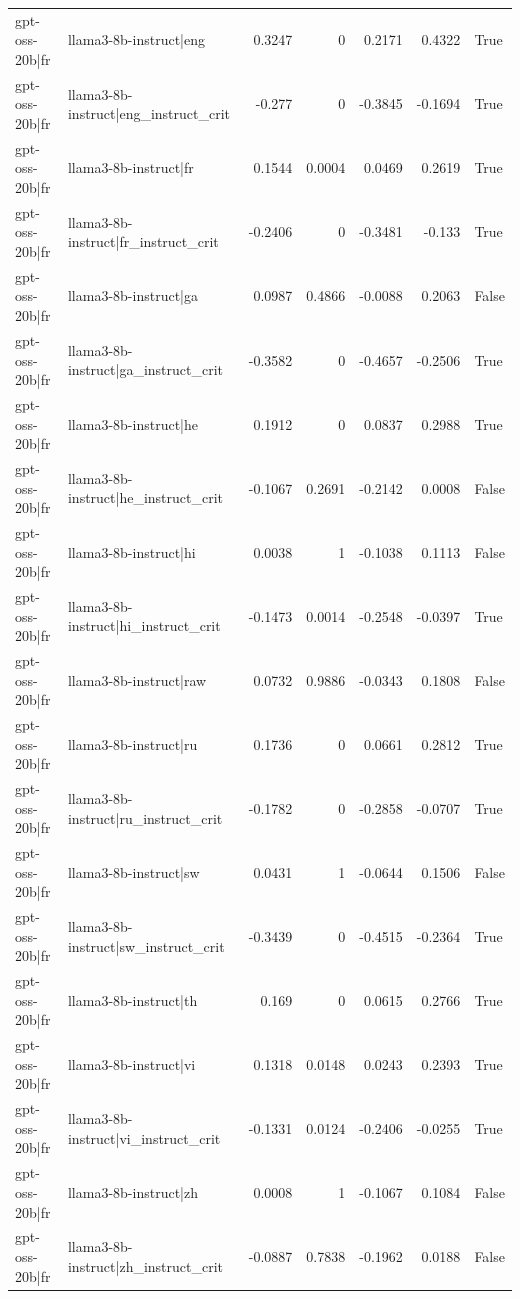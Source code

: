 \begin{table}
\begin{tabular}{l l r r r r l}
gpt-oss-20b|fr & llama3-8b-instruct|eng & 0.3247 & 0 & 0.2171 & 0.4322 & True \\
gpt-oss-20b|fr & llama3-8b-instruct|eng_instruct_crit & -0.277 & 0 & -0.3845 & -0.1694 & True \\
gpt-oss-20b|fr & llama3-8b-instruct|fr & 0.1544 & 0.0004 & 0.0469 & 0.2619 & True \\
gpt-oss-20b|fr & llama3-8b-instruct|fr_instruct_crit & -0.2406 & 0 & -0.3481 & -0.133 & True \\
gpt-oss-20b|fr & llama3-8b-instruct|ga & 0.0987 & 0.4866 & -0.0088 & 0.2063 & False \\
gpt-oss-20b|fr & llama3-8b-instruct|ga_instruct_crit & -0.3582 & 0 & -0.4657 & -0.2506 & True \\
gpt-oss-20b|fr & llama3-8b-instruct|he & 0.1912 & 0 & 0.0837 & 0.2988 & True \\
gpt-oss-20b|fr & llama3-8b-instruct|he_instruct_crit & -0.1067 & 0.2691 & -0.2142 & 0.0008 & False \\
gpt-oss-20b|fr & llama3-8b-instruct|hi & 0.0038 & 1 & -0.1038 & 0.1113 & False \\
gpt-oss-20b|fr & llama3-8b-instruct|hi_instruct_crit & -0.1473 & 0.0014 & -0.2548 & -0.0397 & True \\
gpt-oss-20b|fr & llama3-8b-instruct|raw & 0.0732 & 0.9886 & -0.0343 & 0.1808 & False \\
gpt-oss-20b|fr & llama3-8b-instruct|ru & 0.1736 & 0 & 0.0661 & 0.2812 & True \\
gpt-oss-20b|fr & llama3-8b-instruct|ru_instruct_crit & -0.1782 & 0 & -0.2858 & -0.0707 & True \\
gpt-oss-20b|fr & llama3-8b-instruct|sw & 0.0431 & 1 & -0.0644 & 0.1506 & False \\
gpt-oss-20b|fr & llama3-8b-instruct|sw_instruct_crit & -0.3439 & 0 & -0.4515 & -0.2364 & True \\
gpt-oss-20b|fr & llama3-8b-instruct|th & 0.169 & 0 & 0.0615 & 0.2766 & True \\
gpt-oss-20b|fr & llama3-8b-instruct|vi & 0.1318 & 0.0148 & 0.0243 & 0.2393 & True \\
gpt-oss-20b|fr & llama3-8b-instruct|vi_instruct_crit & -0.1331 & 0.0124 & -0.2406 & -0.0255 & True \\
gpt-oss-20b|fr & llama3-8b-instruct|zh & 0.0008 & 1 & -0.1067 & 0.1084 & False \\
gpt-oss-20b|fr & llama3-8b-instruct|zh_instruct_crit & -0.0887 & 0.7838 & -0.1962 & 0.0188 & False \\

\end{tabular}
\end{table}
